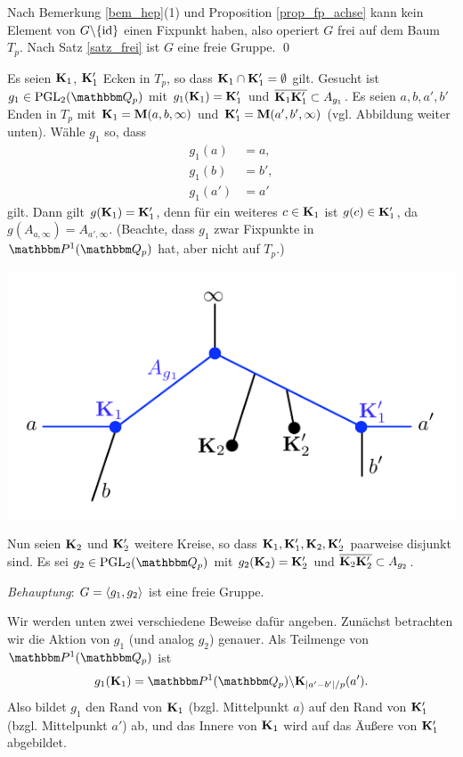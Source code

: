 \documentclass[a4paper, 12pt, twoside]{article}
\begin{document}
\bew Nach
Bemerkung \ref{bem_hep}(1) und Proposition \ref{prop_fp_achse}
kann kein Element von $G\backslash\{\mathrm{id}\}$ einen Fixpunkt haben,
also operiert $G$ frei auf dem Baum $T_p$.
Nach Satz \ref{satz_frei} ist $G$ eine freie Gruppe.
\qed

\BSP Es seien $\mathbf{K}_1$, $\mathbf{K}_1'$ Ecken in $T_p$, so dass
$\mathbf{K}_1\cap\mathbf{K}_1'=\emptyset$ gilt.
Gesucht ist $g_1\in\PGL_2(\QQ_p)$ mit $g_1(\mathbf{K}_1)=\mathbf{K}_1'$ und
$\overline{\mathbf{K}_1 \mathbf{K}_1'}\subset A_{g_1}$.
Es seien $a,b,a',b'$ Enden in $T_p$ mit
$\mathbf{K}_1=\mathbf{M}(a,b,\infty)$ und $\mathbf{K}_1'=\mathbf{M}(a',b',\infty)$
(vgl. Abbildung weiter unten).
Wähle $g_1$ so, dass
\begin{align*}
g_1(a) &= a,\\
g_1(b) &= b',\\
g_1(a') &= a'
\end{align*}
gilt. Dann gilt $g(\mathbf{K}_1)=\mathbf{K}_1'$, denn für ein weiteres $c\in\mathbf{K}_1$
ist $g(c)\in\mathbf{K}_1'$, da $g(A_{a,\infty})=A_{a',\infty}$.
(Beachte, dass $g_1$ zwar
Fixpunkte in $\PP^1(\QQ_p)$ hat, aber nicht auf $T_p$.)
\begin{center}
	\includegraphics{grugraImages/ihara1}
\end{center}
Nun seien $\mathbf{K}_2$ und $\mathbf{K}_2'$ weitere Kreise, so dass
$\mathbf{K}_1,\mathbf{K}_1',\mathbf{K}_2,\mathbf{K}_2'$ paarweise disjunkt sind.
Es sei $g_2\in\PGL_2(\QQ_p)$ mit $g_2(\mathbf{K}_2)=\mathbf{K}_2'$ und
$\overline{\mathbf{K}_2 \mathbf{K}_2'}\subset A_{g_2}$.

\textsl{Behauptung}: $G=\langle g_1, g_2 \rangle$ ist eine freie Gruppe.

Wir werden unten zwei verschiedene Beweise dafür angeben.
Zunächst betrachten wir die Aktion von $g_1$ (und analog $g_2$)
genauer. Als Teilmenge von $\PP^1(\QQ_p)$ ist
\[
g_1(\KU_1) = \PP^1(\QQ_p) \backslash \KU_{|a'-b'|/p}(a').
\]
Also bildet $g_1$ den Rand von $\mathbf{K}_1$  (bzgl. Mittelpunkt $a$) auf
den Rand von $\mathbf{K}_1'$ (bzgl. Mittelpunkt $a'$) ab, und das Innere
von $\mathbf{K}_1$ wird auf das Äußere von $\mathbf{K}_1'$ abgebildet.
\end{document}
